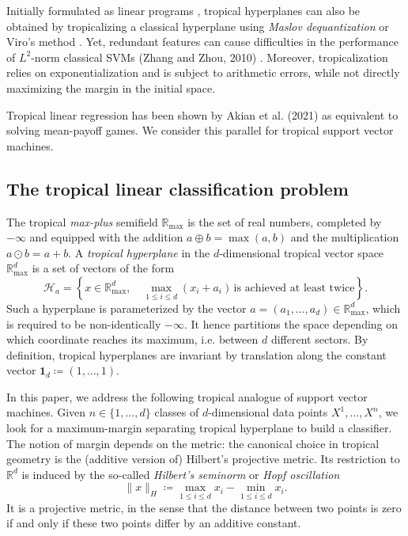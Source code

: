 \documentclass[oneside,UKenglish,a4paper]{amsart}
\numberwithin{equation}{section}
\numberwithin{figure}{section}
\theoremstyle{plain}
\theoremstyle{definition}
\theoremstyle{plain}
\theoremstyle{remark}
\theoremstyle{plain}
\theoremstyle{definition}
\theoremstyle{definition}
\begin{document}
Initially formulated as linear programs \cite{Gartner2006}, tropical hyperplanes can also be obtained by tropicalizing a classical hyperplane using \emph{Maslov dequantization} \cite{litvinov2005maslov} or Viro's method \cite{viro2000dequantization}. Yet, redundant features can cause difficulties in the performance of $L^2$-norm classical SVMs (Zhang and Zhou, 2010) \cite{ZHANG2010373}. Moreover, tropicalization relies on exponentialization and is subject to arithmetic errors, while not directly maximizing the margin in the initial space.

Tropical linear regression has been shown by Akian et al. (2021) \cite{Akian2021TropicalLR} as equivalent to solving mean-payoff games. We consider this parallel for tropical support vector machines.

\subsection*{The tropical linear classification problem}

The tropical \emph{max-plus} semifield $\mathbb{R}_{\max}$ is the
set of real numbers, completed by $-\infty$ and equipped with the
addition $a\oplus b=\max(a,b)$ and the multiplication $a\odot b=a+b$.
A \emph{tropical hyperplane} in the $d$-dimensional tropical vector
space $\mathbb{R}_{\max}^{d}$ is a set of vectors of the form
\begin{equation}
\mathcal{H}_{a}=\left\{x\in\mathbb{R}_{\max}^{d},\quad\max_{1\le i\le d}(x_{i}+a_{i})\,\text{is achieved at least twice}\right\}.\label{eq:unsigned}
\end{equation}
Such a hyperplane is parameterized by the vector $a=(a_{1},\ldots,a_{d})\in\mathbb{R}_{\max}^{d}$,
which is required to be non-identically $-\infty$. It hence partitions
the space depending on which coordinate reaches its maximum, i.e. between $d$ different sectors. By definition, tropical hyperplanes are invariant by translation along the constant vector $\mathbf{1}_d \coloneqq(1,\ldots, 1)$.

In this paper, we address the following tropical analogue of support
vector machines. Given $n\in\{1,\ldots, d\}$ classes of $d$-dimensional data
points $X^{1},\ldots,X^{n}$, we look for a maximum-margin separating
tropical hyperplane to build a classifier. The notion of margin depends
on the metric: the canonical choice in tropical geometry is the (additive
version of) Hilbert's projective metric. Its restriction to $\mathbb{R}^{d}$
is induced by the so-called \emph{Hilbert's seminorm} or \emph{Hopf
oscillation}
\[
\lVert x\rVert_{H}\coloneqq\max_{1\le i\le d}x_{i}-\min_{1\le i\le d}x_{i}.
\]
It is a projective metric, in the sense that the distance between
two points is zero if and only if these two points differ by an additive
constant.
\end{document}
